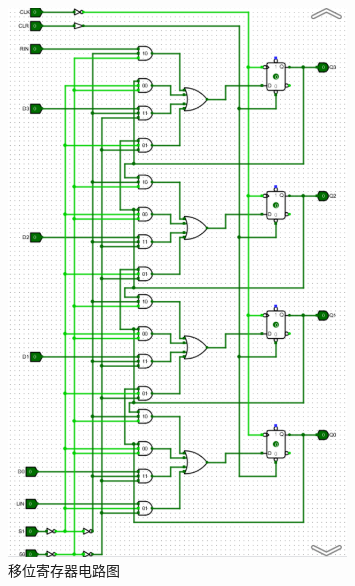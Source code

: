 \documentclass{article}
\begin{document}
    \begin{figure}[H]
    \centering
    \includegraphics[width=0.8\textwidth]{3.4.2.png}
    \caption{移位寄存器电路图}
    \end{figure}
\end{document}
